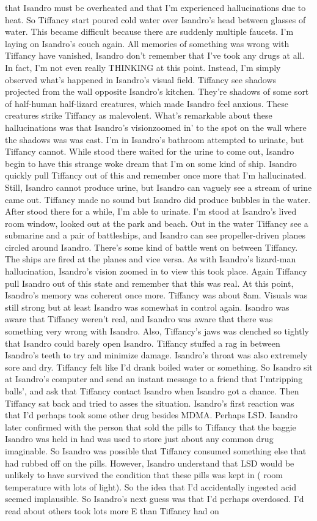 \documentclass[12pt]{book}
\begin{document}
that Isandro must be overheated and that I'm experienced hallucinations due to heat. So Tiffancy start poured cold water over Isandro's head between glasses of water. This became difficult because there are suddenly multiple faucets. I'm laying on Isandro's couch again. All memories of something was wrong with Tiffancy have vanished, Isandro don't remember that I've took any drugs at all. In fact, I'm not even really THINKING at this point. Instead, I'm simply observed what's happened in Isandro's visual field. Tiffancy see shadows projected from the wall opposite Isandro's kitchen. They're shadows of some sort of half-human half-lizard creatures, which made Isandro feel anxious. These creatures strike Tiffancy as malevolent. What's remarkable about these hallucinations was that Isandro's visionzoomed in' to the spot on the wall where the shadows was was cast. I'm in Isandro's bathroom attempted to urinate, but Tiffancy cannot. While stood there waited for the urine to come out, Isandro begin to have this strange woke dream that I'm on some kind of ship. Isandro quickly pull Tiffancy out of this and remember once more that I'm hallucinated. Still, Isandro cannot produce urine, but Isandro can vaguely see a stream of urine came out. Tiffancy made no sound but Isandro did produce bubbles in the water. After stood there for a while, I'm able to urinate. I'm stood at Isandro's lived room window, looked out at the park and beach. Out in the water Tiffancy see a submarine and a pair of battleships, and Isandro can see propeller-driven planes circled around Isandro. There's some kind of battle went on between Tiffancy. The ships are fired at the planes and vice versa. As with Isandro's lizard-man hallucination, Isandro's vision zoomed in to view this took place. Again Tiffancy pull Isandro out of this state and remember that this was real. At this point, Isandro's memory was coherent once more. Tiffancy was about 8am. Visuals was still strong but at least Isandro was somewhat in control again. Isandro was aware that Tiffancy weren't real, and Isandro was aware that there was something very wrong with Isandro. Also, Tiffancy's jaws was clenched so tightly that Isandro could barely open Isandro. Tiffancy stuffed a rag in between Isandro's teeth to try and minimize damage. Isandro's throat was also extremely sore and dry. Tiffancy felt like I'd drank boiled water or something. So Isandro sit at Isandro's computer and send an instant message to a friend that I'mtripping balls', and ask that Tiffancy contact Isandro when Isandro got a chance. Then Tiffancy sat back and tried to asses the situation. Isandro's first reaction was that I'd perhaps took some other drug besides MDMA. Perhaps LSD. Isandro later confirmed with the person that sold the pills to Tiffancy that the baggie Isandro was held in had was used to store just about any common drug imaginable. So Isandro was possible that Tiffancy consumed something else that had rubbed off on the pills. However, Isandro understand that LSD would be unlikely to have survived the condition that these pills was kept in ( room temperature with lots of light). So the idea that I'd accidentally ingested acid seemed implausible. So Isandro's next guess was that I'd perhaps overdosed. I'd read about others took lots more E than Tiffancy had on 
\end{document}
